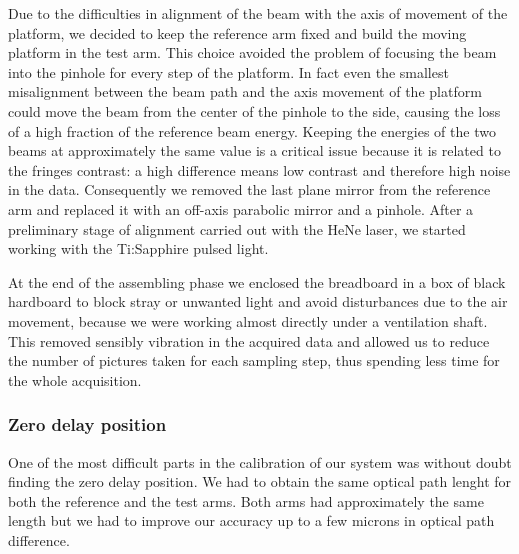 \documentclass[12pt,a4paper,twoside]{article}
\begin{document}
Due to the difficulties in alignment of the beam with the axis of movement of the platform, we decided to keep the reference arm fixed and build the moving platform in the test arm.
This choice avoided the problem of focusing the beam into the pinhole for every step of the platform.
In fact even the smallest misalignment between the beam path and the axis movement of the platform could move the beam from the center of the pinhole to the side, causing the loss of a high fraction of the reference beam energy.
Keeping the energies of the two beams at approximately the same value is a critical issue because it is related to the fringes contrast: a high difference means low contrast and therefore high noise in the data.
Consequently we removed the last plane mirror from the reference arm and replaced it with an off-axis parabolic mirror and a pinhole.
After a preliminary stage of alignment carried out with the HeNe laser, we started working with the Ti:Sapphire pulsed light.

At the end of the assembling phase we enclosed the breadboard in a box of black hardboard to block stray or unwanted light and avoid  disturbances due to the air movement, because we were working almost directly under a ventilation shaft.
This removed sensibly vibration in the acquired data and allowed us to reduce the number of pictures taken for each sampling step, thus spending less time for the whole acquisition.

\subsubsection*{Zero delay position}
One of the most difficult parts in the calibration of our system was without doubt finding the zero delay position.
We had to obtain the same optical path lenght for both the reference and the test arms.
Both arms had approximately the same length but we had to improve our accuracy up to a few microns in optical path difference.
\end{document}
